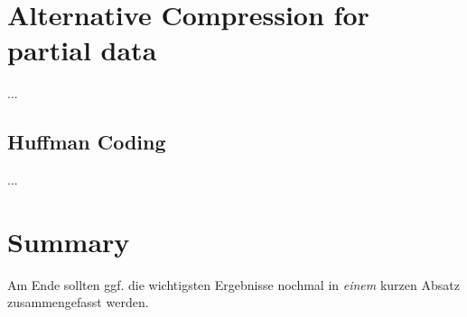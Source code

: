 \section{Alternative Compression for partial data}
\label{ch:Conceptual Design:sec:Alternative Encoding}
...
\subsection{Huffman Coding}
...
\section{Summary}
\label{ch:Conceptual Design:sec:Summary}

Am Ende sollten ggf. die wichtigsten Ergebnisse nochmal in \emph{einem}
kurzen Absatz zusammengefasst werden.

